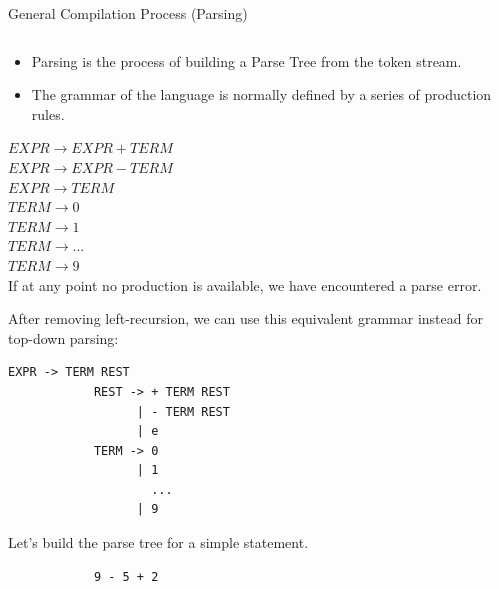 \documentclass{beamer}
\begin{document}
\begin{frame}[fragile]{General Compilation Process (Parsing)}
\begin{columns}[T,onlytextwidth]
        \begin{overprint}
            \begin{itemize}
                \item Parsing is the process of building a Parse Tree from the token stream.
                \item The grammar of the language is normally defined by a series of production rules.
            \end{itemize}

            \hspace*{2cm}$EXPR \rightarrow EXPR + TERM$ \\
            \hspace*{2cm}$EXPR \rightarrow EXPR - TERM$ \\
            \hspace*{2cm}$EXPR \rightarrow TERM$ \\
            \hspace*{2cm}$TERM \rightarrow 0$ \\
            \hspace*{2cm}$TERM \rightarrow 1$ \\
            \hspace*{2cm}$TERM \rightarrow ...$ \\
            \hspace*{2cm}$TERM \rightarrow 9$ \\

            If at any point no production is available, we have encountered a parse error.

            After removing left-recursion, we can use this equivalent grammar instead for top-down parsing:

            \vspace{1em}
            \begin{lstlisting}[escapeinside=~,gobble=4]
            EXPR -> TERM REST
            REST -> + TERM REST
                  | - TERM REST
                  | e
            TERM -> 0
                  | 1
                    ...
                  | 9
            \end{lstlisting}

            Let's build the parse tree for a simple statement.
            \begin{lstlisting}
            9 - 5 + 2
            \end{lstlisting}


\end{overprint}
\end{columns}
\end{frame}
\end{document}

